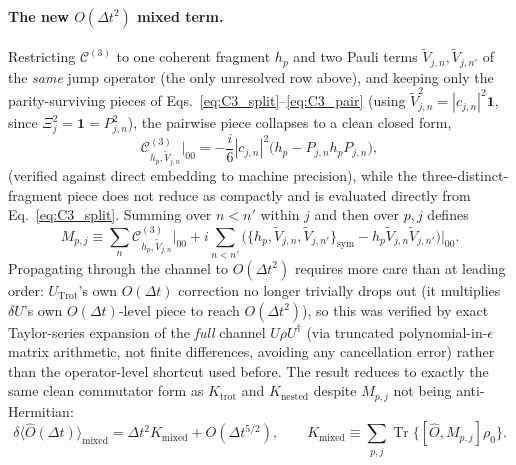 \documentclass[11pt]{article}
\newcommand{\Dt}{\Delta t}
\newcommand{\calC}{\mathcal{C}}
\DeclareMathOperator{\Tr}{Tr}
\begin{document}
\paragraph{The new \texorpdfstring{$O(\Dt^2)$}{O(Dt\^{}2)} mixed term.} Restricting $\calC^{(3)}$ to one coherent fragment $h_p$ and two Pauli terms $\tilde{V}_{j,n},\tilde{V}_{j,n'}$ of the \emph{same} jump operator (the only unresolved row above), and keeping only the parity-surviving pieces of Eqs.~\eqref{eq:C3_split}--\eqref{eq:C3_pair} (using $\tilde{V}_{j,n}^2=|c_{j,n}|^2\mathbf1$, since $\Xi_j^2=\mathbf1=P_{j,n}^2$), the pairwise piece collapses to a clean closed form,
\begin{equation}\label{eq:Mpj_pair}
    \calC^{(3)}_{h_p,\tilde{V}_{j,n}}\Big|_{00} = -\frac{i}{6}|c_{j,n}|^2\big(h_p-P_{j,n}h_pP_{j,n}\big),
\end{equation}
(verified against direct embedding to machine precision), while the three-distinct-fragment piece does not reduce as compactly and is evaluated directly from Eq.~\eqref{eq:C3_split}. Summing over $n<n'$ within $j$ and then over $p,j$ defines
\begin{equation}
    M_{p,j} \equiv \sum_n\calC^{(3)}_{h_p,\tilde{V}_{j,n}}\Big|_{00} + i\sum_{n<n'}\Big(\{h_p,\tilde{V}_{j,n},\tilde{V}_{j,n'}\}_{\text{sym}}-h_p\tilde{V}_{j,n}\tilde{V}_{j,n'}\Big)\Big|_{00}.
\end{equation}
Propagating through the channel to $O(\Dt^2)$ requires more care than at leading order: $U_{\text{Trot}}$'s own $O(\Dt)$ correction no longer trivially drops out (it multiplies $\delta U$'s own $O(\Dt)$-level piece to reach $O(\Dt^2)$), so this was verified by exact Taylor-series expansion of the \emph{full} channel $U\rho U^\dagger$ (via truncated polynomial-in-$\epsilon$ matrix arithmetic, not finite differences, avoiding any cancellation error) rather than the operator-level shortcut used before. The result reduces to exactly the same clean commutator form as $K_{\text{trot}}$ and $K_{\text{nested}}$ despite $M_{p,j}$ not being anti-Hermitian:
\begin{equation}\label{eq:Kmixed}
    \delta\langle\hat{O}(\Dt)\rangle_{\text{mixed}} = \Dt^2K_{\text{mixed}}+O(\Dt^{5/2}),\qquad K_{\text{mixed}}\equiv\sum_{p,j}\Tr\{[\hat{O},M_{p,j}]\rho_0\}.
\end{equation}
\end{document}
